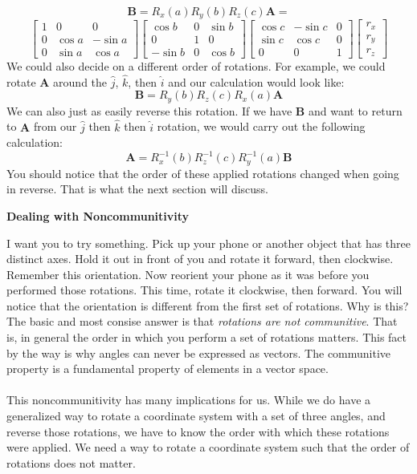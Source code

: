 \documentclass[12pt, letterpaper]{article}
\begin{document}
\[
\textbf{B} = R_x(a)R_y(b)R_z(c)\textbf{A} =
\] \[
\begin{bmatrix}
1 & 0 & 0 \\
0 & \cos a & -\sin a \\
0 & \sin a & \cos a
\end{bmatrix}
\begin{bmatrix}
\cos b & 0 & \sin b \\
0 & 1 & 0 \\
-\sin b & 0 & \cos b
\end{bmatrix}
\begin{bmatrix}
\cos c & -\sin c & 0 \\
\sin c & \cos c & 0 \\
0 & 0 & 1
\end{bmatrix}
\begin{bmatrix}
r_x \\ r_y \\ r_z
\end{bmatrix}
\]
We could also decide on a different order of rotations. For example, we could rotate $\textbf{A}$ around the $\hat{j}$, $\hat{k}$, then $\hat{i}$ and our calculation would look like:
\[
\textbf{B} = R_y(b)R_z(c)R_x(a)\textbf{A}
\]
We can also just as easily reverse this rotation. If we have $\textbf{B}$ and want to return to $\textbf{A}$ from our $\hat{j}$ then $\hat{k}$ then $\hat{i}$ rotation, we would carry out the following calculation:
\[
\textbf{A} = R_x^{-1}(b)R_z^{-1}(c)R_y^{-1}(a)\textbf{B}
\]
You should notice that the order of these applied rotations changed when going in reverse. That is what the next section will discuss.
\pagebreak

\begin{center}
\textbf{Dealing with Noncommunitivity}
\end{center}
I want you to try something. Pick up your phone or another object that has three distinct axes. Hold it out in front of you and rotate it forward, then clockwise. Remember this orientation. Now reorient your phone as it was before you performed those rotations. This time, rotate it clockwise, then forward. You will notice that the orientation is different from the first set of rotations. Why is this? The basic and most consise answer is that \textit{rotations are not communitive}. That is, in general the order in which you perform a set of rotations matters. This fact by the way is why angles can never be expressed as vectors. The communitive property is a fundamental property of elements in a vector space. \\ \\
This noncommunitivity has many implications for us. While we do have a generalized way to rotate a coordinate system with a set of three angles, and reverse those rotations, we have to know the order with which these rotations were applied. We need a way to rotate a coordinate system such that the order of rotations does not matter. 
\end{document}

